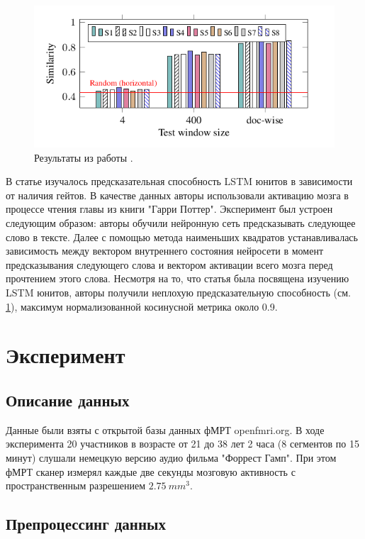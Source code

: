 \documentclass[pdftex,ptm,12pt,a4paper]{report}
\theoremstyle{definition}
\begin{document}
\begin{figure}[h]
\includegraphics[scale=0.4]{images/neural_nets.png}
\centering
\caption{Результаты из работы \cite{qian2016bridging}.}
\label{qian_res}
\end{figure}

В статье \cite{qian2016bridging} изучалось предсказательная способность LSTM юнитов в зависимости от наличия гейтов. В качестве данных авторы использовали активацию мозга в процессе чтения главы из книги "Гарри Поттер". Эксперимент был устроен следующим образом: авторы обучили нейронную сеть предсказывать следующее слово в тексте. Далее с помощью метода наименьших квадратов устанавливалась зависимость между вектором внутреннего состояния нейросети в момент предсказывания следующего слова и вектором активации всего мозга перед прочтением этого слова. Несмотря на то, что статья была посвящена изучению LSTM юнитов, авторы получили неплохую предсказательную способность (см. \ref{qian_res}), максимум нормализованной косинусной метрика около 0.9.


\chapter{Эксперимент}

\section{Описание данных}

Данные были взяты с открытой базы данных фМРТ openfmri.org. В ходе эксперимента 20 участников в возрасте от 21 до 38 лет 2 часа (8 сегментов по 15 минут) слушали немецкую версию аудио фильма "Форрест Гамп". При этом фМРТ сканер измерял каждые две секунды мозговую активность с пространственным разрешением $2.75\ mm^3$.

\section{Препроцессинг данных}
\end{document}
